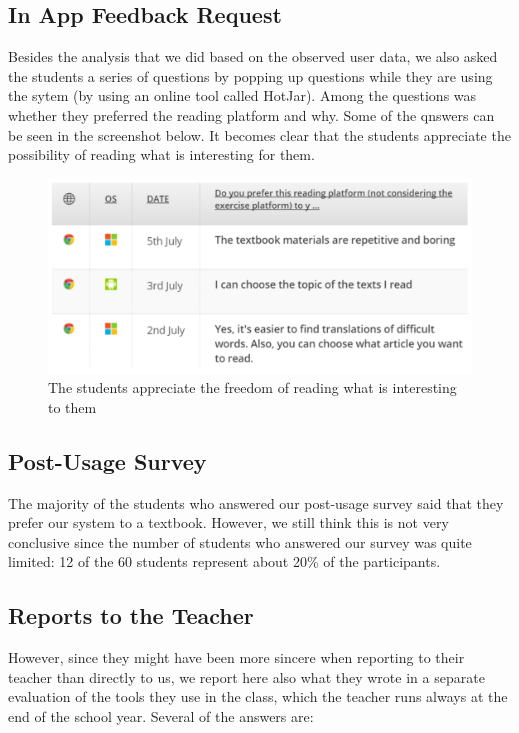 \subsection{In App Feedback Request}
Besides the analysis that we did based on the observed user data, we also asked the students a series of questions by popping up questions while they are using the sytem (by using an online tool called HotJar). Among the questions was whether they preferred the reading platform and why. Some of the qnswers can be seen in the screenshot below. It becomes clear that the students appreciate the possibility of reading what is interesting for them.

    \begin{figure}[h!]
    \centering
      \includegraphics[width=0.9\columnwidth]{figures/opinion_on_reading_platform}
      \caption{The students appreciate the freedom of reading what is interesting to them }
    \end{figure}

\subsection{Post-Usage Survey}

The majority of the students who answered our post-usage survey said that  they prefer our system to a textbook. However, we still think this is not very conclusive since the number of students who answered our survey was quite limited: 12 of the 60 students represent about 20\% of the participants. 


\subsection{Reports to the Teacher}
However, since they might have been more sincere when reporting to their teacher than directly to us, we report here also what they wrote in a separate evaluation of the tools they use in the class, which the teacher runs always at the end of the school year. Several of the answers are: 

